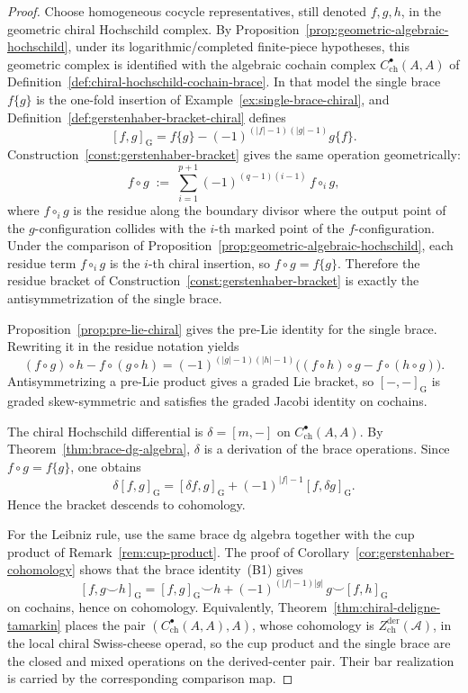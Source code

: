 \begin{proof}
Choose homogeneous cocycle representatives, still denoted
$f,g,h$, in the geometric chiral Hochschild complex. By
Proposition~\ref{prop:geometric-algebraic-hochschild}, under its
logarithmic/completed finite-piece hypotheses, this geometric complex
is identified with the algebraic cochain complex
$C^\bullet_{\mathrm{ch}}(A,A)$ of
Definition~\ref{def:chiral-hochschild-cochain-brace}. In that
model the single brace $f\{g\}$ is the one-fold insertion of
Example~\ref{ex:single-brace-chiral}, and
Definition~\ref{def:gerstenhaber-bracket-chiral} defines
\[
[f,g]_{\mathrm G}
=
f\{g\}
-(-1)^{(|f|-1)(|g|-1)}g\{f\}.
\]
Construction~\ref{const:gerstenhaber-bracket} gives the same
operation geometrically:
\[
f \circ g
\;:=\;
\sum_{i=1}^{p+1} (-1)^{(q-1)(i-1)}\, f \circ_i g,
\]
where $f \circ_i g$ is the residue along the boundary divisor where
the output point of the $g$-configuration collides with the
$i$-th marked point of the $f$-configuration. Under the
comparison of Proposition~\ref{prop:geometric-algebraic-hochschild}, each
residue term $f \circ_i g$ is the $i$-th chiral insertion, so
$f \circ g = f\{g\}$. Therefore the residue bracket of
Construction~\ref{const:gerstenhaber-bracket} is exactly the
antisymmetrization of the single brace.

Proposition~\ref{prop:pre-lie-chiral} gives the pre-Lie identity
for the single brace. Rewriting it in the residue notation yields
\[
(f \circ g)\circ h - f \circ (g \circ h)
=
(-1)^{(|g|-1)(|h|-1)}
\bigl((f \circ h)\circ g - f \circ (h \circ g)\bigr).
\]
Antisymmetrizing a pre-Lie product gives a graded Lie bracket, so
$[-,-]_{\mathrm G}$ is graded skew-symmetric and satisfies the
graded Jacobi identity on cochains.

The chiral Hochschild differential is $\delta=[m,-]$ on
$C^\bullet_{\mathrm{ch}}(A,A)$. By
Theorem~\ref{thm:brace-dg-algebra}, $\delta$ is a derivation of the
brace operations. Since $f \circ g = f\{g\}$, one obtains
\[
\delta [f,g]_{\mathrm G}
=
[\delta f,g]_{\mathrm G}
+
(-1)^{|f|-1}[f,\delta g]_{\mathrm G}.
\]
Hence the bracket descends to cohomology.

For the Leibniz rule, use the same brace dg algebra together with
the cup product of Remark~\ref{rem:cup-product}. The proof of
Corollary~\ref{cor:gerstenhaber-cohomology} shows that the brace
identity~\textup{(}B1\textup{)} gives
\[
[f, g \smile h]_{\mathrm G}
=
[f,g]_{\mathrm G}\smile h
+
(-1)^{(|f|-1)|g|}\, g \smile [f,h]_{\mathrm G}
\]
on cochains, hence on cohomology. Equivalently,
Theorem~\ref{thm:chiral-deligne-tamarkin} places the pair
$(C^\bullet_{\mathrm{ch}}(A,A),A)$, whose cohomology is
$Z^{\mathrm{der}}_{\mathrm{ch}}(\mathcal{A})$, in the local chiral
Swiss-cheese operad, so the cup product and the single brace are
the closed and mixed operations on the derived-center pair.  Their
bar realization is carried by the corresponding comparison map.


\end{proof}
